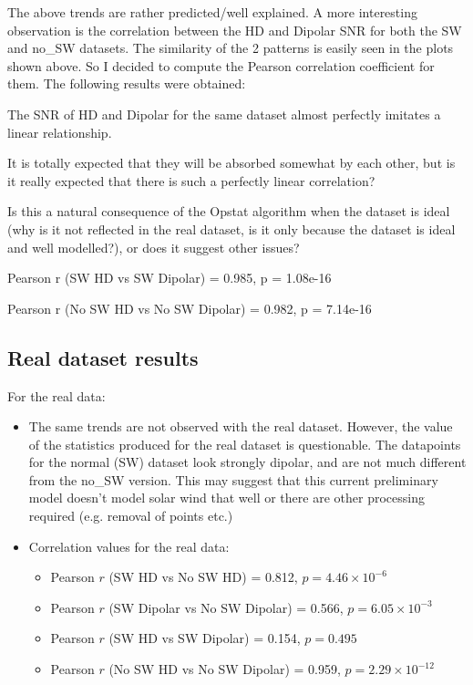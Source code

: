 \documentclass[12pt,a4paper]{article}
\begin{document}
The above trends are rather predicted/well explained. A more interesting observation is the correlation between the HD and Dipolar SNR for both the SW and no\_SW datasets. The similarity of the 2 patterns is easily seen in the plots shown above. So I decided to compute the Pearson correlation coefficient for them. The following results were obtained:

The SNR of HD and Dipolar for the same dataset almost perfectly imitates a linear relationship.

It is totally expected that they will be absorbed somewhat by each other, but is it really expected that there is such a perfectly linear correlation?

Is this a natural consequence of the Opstat algorithm when the dataset is ideal (why is it not reflected in the real dataset, is it only because the dataset is ideal and well modelled?), or does it suggest other issues?

Pearson r (SW HD vs SW Dipolar) = 0.985, p = 1.08e-16

Pearson r (No SW HD vs No SW Dipolar) = 0.982, p = 7.14e-16

\subsection{Real dataset results}
For the real data:

\begin{itemize}
  \item The same trends are not observed with the real dataset. However, the value of the statistics produced for the real dataset is questionable. The datapoints for the normal (SW) dataset look strongly dipolar, and are not much different from the no\_SW version. This may suggest that this current preliminary model doesn't model solar wind that well or there are other processing required (e.g. removal of points etc.)
  \item Correlation values for the real data:
    \begin{itemize}
      \item Pearson \(r\) (SW HD vs No SW HD) = 0.812, \(p = 4.46\times10^{-6}\)
      \item Pearson \(r\) (SW Dipolar vs No SW Dipolar) = 0.566, \(p = 6.05\times10^{-3}\)
      \item Pearson \(r\) (SW HD vs SW Dipolar) = 0.154, \(p = 0.495\)
      \item Pearson \(r\) (No SW HD vs No SW Dipolar) = 0.959, \(p = 2.29\times10^{-12}\)
    \end{itemize}
\end{itemize}
\end{document}
